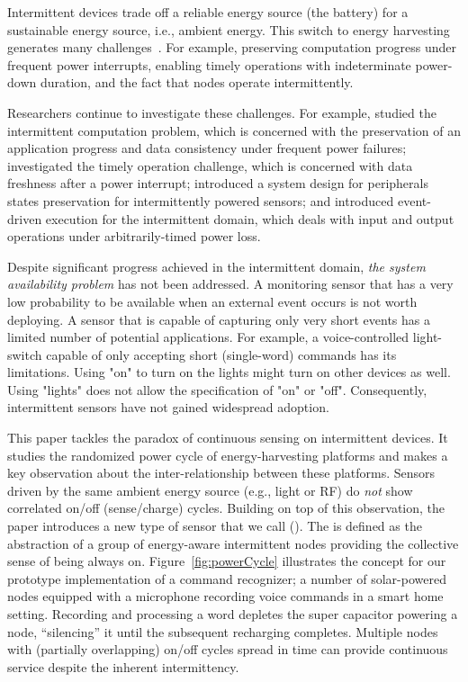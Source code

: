 Intermittent devices trade off a reliable energy source (the battery) for a sustainable
energy source, i.e., ambient energy. This switch to energy harvesting generates many challenges~\cite{lucia2017intermittent}. For example, preserving computation progress under frequent power interrupts, enabling timely operations with indeterminate power-down duration, and the fact that nodes operate intermittently. 

Researchers continue to investigate these challenges. For example, \cite{lucia2017intermittent,mementos,dino,colin2016chain,balsamo2015hibernus} studied the intermittent computation problem, which is concerned with the preservation of an application progress and data consistency under frequent power failures; \cite{hester2017timely} investigated the timely operation challenge, which is concerned with data freshness after a power interrupt; \cite{samoyed_pldi_2019} introduced a system design for peripherals states preservation for intermittently powered sensors;  and \cite{yildirim2018ink} introduced event-driven execution for the intermittent domain, which deals with input and output operations under arbitrarily-timed power loss.

Despite significant progress achieved in the intermittent domain, \textit{the system availability problem} has not been addressed. A monitoring sensor that has a very low probability to be available when an external event occurs is not worth deploying. A sensor that is capable of capturing only very short events has a limited number of potential applications. 
For example, a voice-controlled light-switch capable of only accepting short (single-word) commands has its limitations. Using "on" to turn on the lights might turn on other devices as well. Using "lights" does not allow the specification of "on" or "off". Consequently, intermittent sensors have not gained widespread adoption.

This paper tackles the paradox of continuous sensing on intermittent devices. It studies the randomized power cycle of energy-harvesting platforms and makes a key observation about the inter-relationship between these platforms. Sensors driven by the same ambient energy source (e.g., light or RF) do {\em not} show correlated on/off (sense/charge) cycles. Building on top of this observation, the paper introduces a new type of sensor that we call \textit{\fullsys} (\sys). The \sys is defined as the abstraction of a group of energy-aware intermittent nodes providing the collective sense of being always on. Figure~\ref{fig:powerCycle} illustrates the \sys concept for our prototype implementation of a command recognizer; a number of solar-powered nodes equipped with a microphone recording voice commands in a smart home setting. Recording and processing a word depletes the super capacitor powering a node, ``silencing'' it until the subsequent recharging completes. Multiple nodes with (partially overlapping) on/off cycles spread in time can provide continuous service despite the inherent intermittency.


